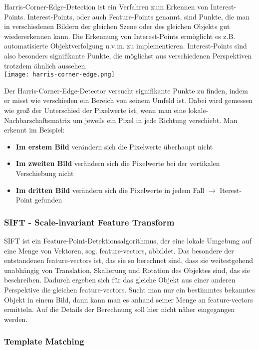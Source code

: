 Harris-Corner-Edge-Detection ist ein Verfahren zum Erkennen von Interest-Points. Interest-Points, oder auch Feature-Points genannt, sind Punkte, die man in verschiedenen Bildern der gleichen Szene oder des gleichen Objekts gut wiedererkennen kann. Die Erkennung von Interest-Points ermöglicht es z.B. automatisierte Objektverfolgung u.v.m. zu implementieren. Interest-Points sind also besonders signifikante Punkte, die möglichst aus verschiedenen Perspektiven trotzdem ähnlich aussehen.\\

\texttt{[image: harris-corner-edge.png]}

Der Harris-Corner-Edge-Detector versucht signifikante Punkte zu finden, indem er misst wie verschieden ein Bereich von seinem Umfeld ist. Dabei wird gemessen wie groß der Unterschied der Pixelwerte ist, wenn man eine lokale-Nachbarschaftsmatrix um jeweils ein Pixel in jede Richtung verschiebt. Man erkennt im Beispiel:
\begin{itemize}
    \item \textbf{Im erstem Bild} verändern sich die Pixelwerte überhaupt nicht
    \item \textbf{Im zweiten Bild} verändern sich die Pixelwerte bei der vertikalen Verschiebung nicht
    \item \textbf{Im dritten Bild} verändern sich die Pixelwerte in jedem Fall $\rightarrow$ Iterest-Point gefunden
\end{itemize}

\subsubsection{SIFT - Scale-invariant Feature Transform}
\label{sec:sift}
SIFT ist ein Feature-Point-Detektionsalgorithmus, der eine lokale Umgebung auf eine Menge von Vektoren, sog. feature-vectors, abbildet. Das besondere der entstandenen feature-vectors ist, das sie so berechnet sind, dass sie weitestgehend unabhängig von Translation, Skalierung und Rotation des Objektes sind, das sie beschreiben. Dadurch ergeben sich für das gleiche Objekt aus einer anderen Perspektive die gleichen feature-vectors. Sucht man nur ein bestimmtes bekanntes Objekt in einem Bild, dann kann man es anhand seiner Menge an feature-vectors ermitteln. Auf die Details der Berechnung soll hier nicht näher eingegangen werden.

\subsubsection{Template Matching}

